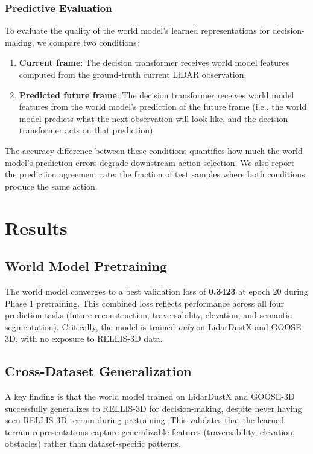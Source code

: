 \documentclass[sensors,article,submit,pdftex,moreauthors]{Definitions/mdpi}
\begin{document}
\subsubsection{Predictive Evaluation}
To evaluate the quality of the world model's learned representations for decision-making, we compare two conditions:
\begin{enumerate}
    \item \textbf{Current frame}: The decision transformer receives world model features computed from the ground-truth current LiDAR observation.
    \item \textbf{Predicted future frame}: The decision transformer receives world model features from the world model's prediction of the future frame (i.e., the world model predicts what the next observation will look like, and the decision transformer acts on that prediction).
\end{enumerate}
The accuracy difference between these conditions quantifies how much the world model's prediction errors degrade downstream action selection. We also report the prediction agreement rate: the fraction of test samples where both conditions produce the same action.

\section{Results}
\label{sec:results}

\subsection{World Model Pretraining}

The world model converges to a best validation loss of \textbf{0.3423} at epoch 20 during Phase 1 pretraining. This combined loss reflects performance across all four prediction tasks (future reconstruction, traversability, elevation, and semantic segmentation). Critically, the model is trained \emph{only} on LidarDustX and GOOSE-3D, with no exposure to RELLIS-3D data.

\subsection{Cross-Dataset Generalization}

A key finding is that the world model trained on LidarDustX and GOOSE-3D successfully generalizes to RELLIS-3D for decision-making, despite never having seen RELLIS-3D terrain during pretraining. This validates that the learned terrain representations capture generalizable features (traversability, elevation, obstacles) rather than dataset-specific patterns.
\end{document}

